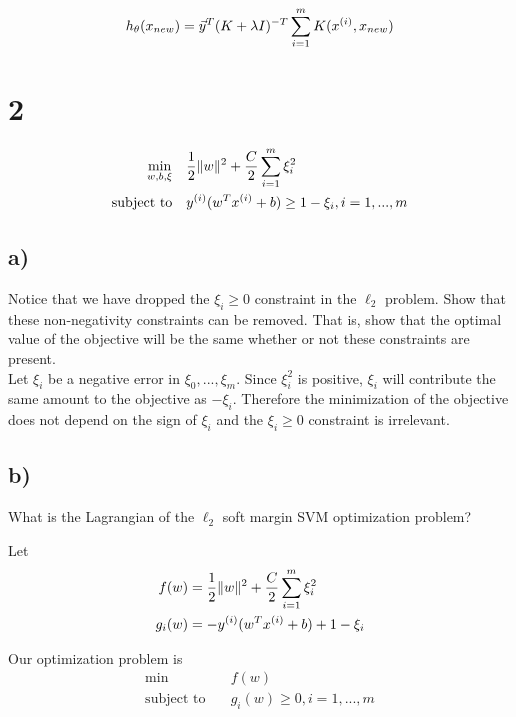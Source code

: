 \documentclass[11pt]{article}
\begin{document}
\begin{align*}
  h_{\theta}(x_{new}) &= \vec{y}^{T} (K + \lambda I)^{-T} \sum_{i=1}^{m} K(x^{(i)}, x_{new}) \\
\end{align*}

\section*{2}

\begin{align*}
  \underset{w,b,\xi}{\text{min}} &\quad \frac{1}{2} \|w\|^{2} + \frac{C}{2} \sum_{i=1}^{m} \xi_{i}^{2} \\
  \text{subject to} &\quad y^{(i)} (w^{T} x^{(i)} + b) \geq 1 - \xi_i, i = 1,...,m \\
\end{align*}

\subsection*{a)}

Notice that we have dropped the $\xi_{i} \geq 0$ constraint in the $\ell_2$ problem. Show that these non-negativity constraints can be removed. That is, show that the optimal value of the objective will be the same whether or not these constraints are present. \\

Let $\xi_i$ be a negative error in $\xi_0,...,\xi_m$. Since $\xi_i^{2}$ is positive, $\xi_i$ will contribute the same amount to the objective as $-\xi_i$. Therefore the minimization of the objective does not depend on the sign of $\xi_i$ and the $\xi_i \geq 0$ constraint is irrelevant.

\subsection*{b)}

What is the Lagrangian of the $\ell_2$ soft margin SVM optimization problem?

Let
\begin{align*}
  f(w)   &= \frac{1}{2} \|w\|^{2} + \frac{C}{2} \sum_{i=1}^{m} \xi_i^2 \\
  g_i(w) &= -y^{(i)} (w^T x^{(i)} + b) + 1 - \xi_i \\
\end{align*}

Our optimization problem is
\begin{align*}
  \text{min}        &\quad f(w) \\
  \text{subject to} &\quad g_i(w) \geq 0, i = 1,...,m \\
\end{align*}
\end{document}
